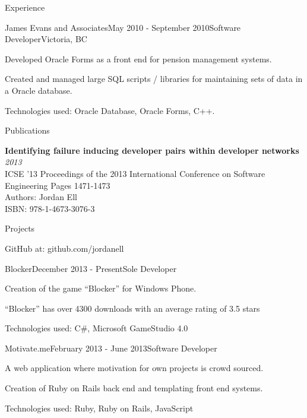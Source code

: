 \documentclass{resume} %
\begin{document}
\begin{rSection}{Experience}

\begin{rSubsection}{James Evans and Associates}{May 2010 - September 2010}{Software Developer}{Victoria, BC}
\item Developed Oracle Forms as a front end for pension management systems.
\item Created and managed large SQL scripts / libraries for maintaining sets of data in a Oracle database.
\item Technologies used: Oracle Database, Oracle Forms, C++.
\end{rSubsection}

\end{rSection}


\begin{rSection}{Publications}

{\bf Identifying failure inducing developer pairs within developer networks} \hfill {\em2013} \\
ICSE '13 Proceedings of the 2013 International Conference on Software Engineering Pages 1471-1473 \\
Authors: Jordan Ell \\
ISBN: 978-1-4673-3076-3

\end{rSection}


\begin{rSection}{Projects}

GitHub at: github.com/jordanell

\begin{rSubsection}{Blocker}{December 2013 - Present}{Sole Developer}{}
\item Creation of the game ``Blocker'' for Windows Phone.
\item ``Blocker'' has over 4300 downloads with an average rating of 3.5 stars
\item Technologies used: C\#, Microsoft GameStudio 4.0
\end{rSubsection}

\begin{rSubsection}{Motivate.me}{February 2013 - June 2013}{Software Developer}{}
\item A web application where motivation for own projects is crowd sourced.
\item Creation of Ruby on Rails back end and templating front end systems.
\item Technologies used: Ruby, Ruby on Rails, JavaScript
\end{rSubsection}

\end{rSection}
\end{document}

